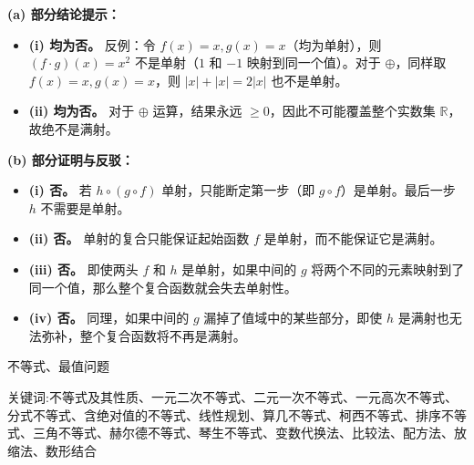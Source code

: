 \begin{questions}
\begin{solution}
\textbf{(a) 部分结论提示：}
\begin{itemize}
    \item \textbf{(i) 均为否。} 反例：令 $f(x)=x, g(x)=x$（均为单射），则 $(f \cdot g)(x)=x^2$ 不是单射（$1$ 和 $-1$ 映射到同一个值）。对于 $\oplus$，同样取 $f(x)=x, g(x)=x$，则 $|x|+|x|=2|x|$ 也不是单射。
    \item \textbf{(ii) 均为否。} 对于 $\oplus$ 运算，结果永远 $\ge 0$，因此不可能覆盖整个实数集 $\mathbb{R}$，故绝不是满射。
\end{itemize}

\textbf{(b) 部分证明与反驳：}
\begin{itemize}
    \item \textbf{(i) 否。} 若 $h \circ (g \circ f)$ 单射，只能断定第一步（即 $g \circ f$）是单射。最后一步 $h$ 不需要是单射。
    \item \textbf{(ii) 否。} 单射的复合只能保证起始函数 $f$ 是单射，而不能保证它是满射。
    \item \textbf{(iii) 否。} 即使两头 $f$ 和 $h$ 是单射，如果中间的 $g$ 将两个不同的元素映射到了同一个值，那么整个复合函数就会失去单射性。
    \item \textbf{(iv) 否。} 同理，如果中间的 $g$ 漏掉了值域中的某些部分，即使 $h$ 是满射也无法弥补，整个复合函数将不再是满射。
\end{itemize}
\end{solution}
\end{questions}
\pagebreak

\begin{center}
  {\fontsize{30pt}{26pt}\selectfont
    \hypertarget{不等式、最值问题}{不等式、最值问题} \label{不等式、最值问题}
  }
\end{center}
\separator
\begin{center}
    关键词:不等式及其性质、一元二次不等式、二元一次不等式、一元高次不等式、分式不等式、含绝对值的不等式、线性规划、算几不等式、柯西不等式、排序不等式、三角不等式、赫尔德不等式、琴生不等式、变数代换法、比较法、配方法、放缩法、数形结合
\end{center}
\vspace{0.5pt}

